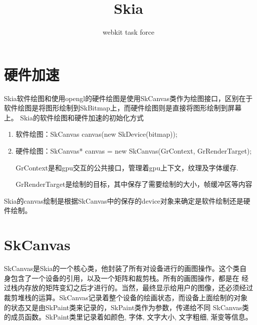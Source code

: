 

\title{Skia}
\author{webkit task force}
\maketitle

\section{硬件加速}
Skia软件绘图和使用opengl的硬件绘图是使用SkCanvas类作为绘图接口，区别在于软件绘图是将图形绘制到SkBitmap上，而硬件绘图则是直接将图形绘制到屏幕上。
Skia的软件绘图和硬件加速的初始化方式

\begin{enumerate}
	\item 软件绘图：SkCanvas canvas(new SkDevice(bitmap));
	\item 硬件绘图：SkCanvas* canvas = new SkCanvas(GrContext, GrRenderTarget);

			GrContext是和gpu交互的公共接口，管理着gpu上下文，纹理及字体缓存.

			GrRenderTarget是绘制的目标，其中保存了需要绘制的大小，帧缓冲区等内容
\end{enumerate}

Skia的canvas绘制是根据SkCanvas中的保存的device对象来确定是软件绘制还是硬件绘制。

\section{SkCanvas}
SkCanvas是Skia的一个核心类，他封装了所有对设备进行的画图操作。这个类自身包含了一个设备的引用，以及一个矩阵和裁剪栈。所有的画图操作，都是在 经过栈内存放的矩阵变幻之后才进行的。当然，最终显示给用户的图像，还必须经过裁剪堆栈的运算。SkCanvas记录着整个设备的绘画状态，而设备上面绘制的对象的状态又是由SkPaint类来记录的，SkPaint类作为参数，传递给不同 SkCanvas类的成员函数。SkPaint类里记录着如颜色, 字体, 文字大小, 文字粗细, 渐变等信息。

